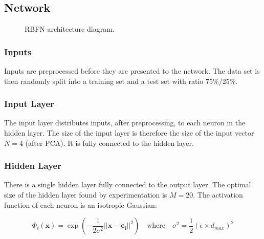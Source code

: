 \documentclass[a4paper, 11pt]{article}
\begin{document}
\subsection*{Network}
\begin{figure}[h]
\centering
  \caption{RBFN architecture diagram.}
  \label{fig:architecture}
\end{figure}

\subsubsection*{Inputs}
Inputs are preprocessed before they are presented to the network. The data set is then randomly split into a training set and a test set with ratio 75\%/25\%.

\subsubsection*{Input Layer}
The input layer distributes inputs, after preprocessing, to each neuron in the hidden layer. The size of the input layer is therefore the size of the input vector $N=4$ (after PCA). It is fully connected to the hidden layer.

\subsubsection*{Hidden Layer}
There is a single hidden layer fully connected to the output layer. The optimal size of the hidden layer found by experimentation is $M=20$. The activation function of each neuron is an isotropic Gaussian:

\begin{equation}
\Phi_i(\boldsymbol{x}) = \exp\left(-\frac{1}{2\sigma^2} \lvert\lvert \boldsymbol{x} -  \boldsymbol{c_i} \rvert\rvert ^2\right)
\quad \mathrm{where }\quad
\sigma^2 = \frac{1}{2}(\epsilon \times d_{max})^2
\label{eq:rbf}
\end{equation}
\end{document}
